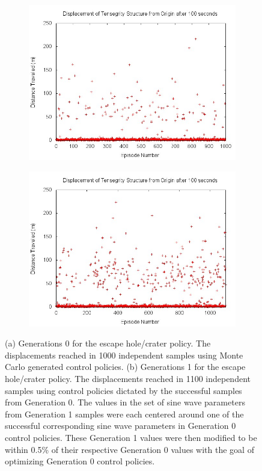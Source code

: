 \begin{figure}
\vspace{-0.4in}
\centering
\begin{subfigure}{.5\textwidth}
  \centering
  \includegraphics[width=\linewidth]{tex/ARMS_2015/Pictures/gen0distances.jpg}
  \caption{}
  \label{gen0scatter}
\end{subfigure}%
\begin{subfigure}{.5\textwidth}
  \centering
  \includegraphics[width=\linewidth]{tex/ARMS_2015/Pictures/gen1distances.jpg}
  \caption{}
  \label{gen1scatter}
\end{subfigure}
\caption{(a) Generations 0 for the escape hole/crater policy. The displacements reached in 1000 independent samples using Monte Carlo generated control policies. (b) Generations 1 for the escape hole/crater policy. The displacements reached in 1100 independent samples using control policies dictated by the successful samples from Generation 0. The values in the set of sine wave parameters from Generation 1 samples were each centered around one of the successful corresponding sine wave parameters in Generation 0 control policies. These Generation 1 values were then modified to be within 0.5\% of their respective Generation 0 values with the goal of optimizing Generation 0 control policies.}
\vspace{-0.1in}
\label{fig:genScatter}
\end{figure}

